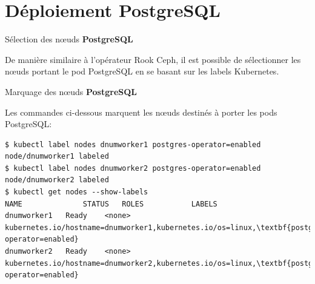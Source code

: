 \section{Déploiement PostgreSQL}


\begin{frame}[fragile]{Sélection des n\oe{}uds \textbf{PostgreSQL}}

   De manière similaire à l'opérateur Rook Ceph, il est possible de sélectionner les n\oe{}uds portant le pod PostgreSQL en se basant sur les labels Kubernetes.\\
\end{frame}


\begin{frame}[shrink=5,fragile]{Marquage des n\oe{}uds \textbf{PostgreSQL}}

   Les commandes ci-dessous marquent les n\oe{}uds destinés à porter les pods PostgreSQL:
\begin{tiny}
\begin{Verbatim}[commandchars=\\\{\}]
$ kubectl label nodes dnumworker1 postgres-operator=enabled
node/dnumworker1 labeled
$ kubectl label nodes dnumworker2 postgres-operator=enabled
node/dnumworker2 labeled
$ kubectl get nodes --show-labels
NAME              STATUS   ROLES           LABELS
dnumworker1   Ready    <none>          kubernetes.io/hostname=dnumworker1,kubernetes.io/os=linux,\textbf{postgres-operator=enabled}
dnumworker2   Ready    <none>          kubernetes.io/hostname=dnumworker2,kubernetes.io/os=linux,\textbf{postgres-operator=enabled}
\end{Verbatim}
\end{tiny}
\end{frame}


